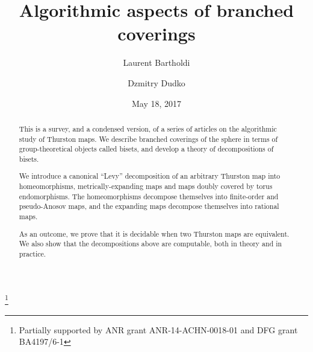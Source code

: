 \documentclass{amsart}
\begin{document}
\title{Algorithmic aspects of branched coverings}
\author{Laurent Bartholdi}
\author{Dzmitry Dudko}
\address{\'Ecole Normale Sup\'erieure, Paris \emph{and} Mathematisches Institut, Georg-August Universit\"at zu G\"ottingen}
\thanks{Partially supported by ANR grant ANR-14-ACHN-0018-01 and DFG grant BA4197/6-1}
\date{May 18, 2017}
\begin{abstract}
  This is a survey, and a condensed version, of a series of articles
  on the algorithmic study of Thurston maps. We describe branched
  coverings of the sphere in terms of group-theoretical objects called
  bisets, and develop a theory of decompositions of bisets.

  We introduce a canonical ``Levy'' decomposition of an arbitrary
  Thurston map into homeomorphisms, metrically-expanding maps and maps
  doubly covered by torus endomorphisms. The homeomorphisms decompose
  themselves into finite-order and pseudo-Anosov maps, and the
  expanding maps decompose themselves into rational maps.

  As an outcome, we prove that it is decidable when two Thurston maps
  are equivalent. We also show that the decompositions above are
  computable, both in theory and in practice.

\end{abstract}
\end{document}
